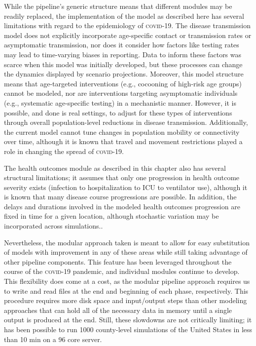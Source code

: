 {While the pipeline’s generic structure means that different modules may be readily replaced, the implementation of the model as described here has several limitations with regard to the epidemiology of \textsc{covid}-19. The disease transmission model does not explicitly incorporate age-specific contact or transmission rates or asymptomatic transmission, nor does it consider how factors like testing rates may lead to time-varying biases in reporting. Data to inform these factors was scarce when this model was initially developed, but these processes can change the dynamics displayed by scenario projections. Moreover, this model structure means that age-targeted interventions  (e.g., cocooning of high-risk age groups) cannot be modeled, nor are interventions targeting asymptomatic individuals (e.g., systematic age-specific testing) in a mechanistic manner. However, it is possible, and done is real settings, to adjust for these types of interventions through overall population-level reductions in disease transmission. Additionally, the current model cannot tune changes in population mobility or connectivity over time, although it is known that travel and movement restrictions played a role in changing the spread of \textsc{covid}-19.

The health outcomes module as described in this chapter also has several structural limitations; it assumes that only one progression in health outcome severity exists (infection to hospitalization to ICU to ventilator use), although it is known that many disease course progressions are possible. In addition, the delays and durations involved in the modeled health outcomes progression are fixed in time for a given location, although stochastic variation may be incorporated across simulations..

Nevertheless, the modular approach taken is meant to allow for easy substitution of models with improvement in any of these areas while still taking advantage of other pipeline components. This feature has been leveraged throughout the course of the \textsc{covid}-19 pandemic, and individual modules continue to develop. This flexibility does come at a cost, as the modular pipeline approach requires us to write and read files at the end and beginning of each phase, respectively. This procedure requires more disk space and input/output steps than other modeling approaches that can hold all of the necessary data in memory until a single output is produced at the end. Still, these slowdowns are not critically limiting; it has been possible to run 1000 county-level simulations of the United States in less than 10 min on a 96 core server.

}
